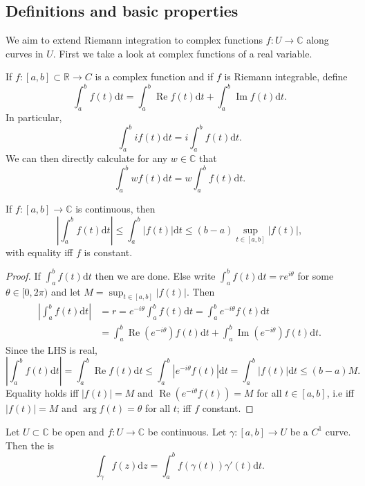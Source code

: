 \documentclass[egregdoesnotlikesansseriftitles,a4paper]{scrartcl}
\begin{document}
\subsection{Definitions and basic properties}
We aim to extend Riemann integration to complex functions $f: U \rightarrow \mathbb{C}$ along curves in $U$. First we take a look at complex functions of a real variable. 
\begin{definition*}
      If $f: [a,b] \subset \mathbb{R} \rightarrow C$ is a complex function and if $f$ is Riemann integrable, define \[
      \int_{a}^{b}f (t) \mathrm{d}t= \int_{a}^{b}\operatorname{Re} f (t) \mathrm{d}t+ \int_{a}^{b}\operatorname{Im}f (t) \mathrm{d}t   
      .\] In particular, \[
      \int_{a}^{b}i f (t) \mathrm{d}t =i \int_{a}^{b}f (t) \mathrm{d}t  
      .\] We can then directly calculate for any $w \in \mathbb{C}$ that \[
          \int_{a}^{b}w f (t) \mathrm{d}t =w\int_{a}^{b}f (t) \mathrm{d}t 
      .\] 
\end{definition*}
\begin{proposition}
      If $f: [a,b] \rightarrow \mathbb{C}$ is continuous, then \[
      |\int_{a}^{b} f (t) \mathrm{d}t | \leq \int_{a}^{b} |f (t)| \mathrm{d}t \leq (b-a) \sup_{t \in [a,b]} |f (t)|
      ,\] with equality iff $f$ is constant. 
\end{proposition}
\begin{proof}
      If $\int_{a}^{b}f (t) \mathrm{d}t $ then we are done. Else write $\int_{a}^{b}f (t) \mathrm{d}t= re^{i \theta} $ for some $\theta \in [0,2\pi)$ and let $M=\sup_{t \in [a,b]} |f (t)|$. Then 
      \begin{align*}
           |\int_{a}^{b}f (t) \mathrm{d}t| &=r= e^{-i \theta}\int_{a}^{b}f (t) \mathrm{d}t=\int_{a}^{b}e^{-i \theta}f (t) \mathrm{d}t\\
           &=\int_{a}^{b}\operatorname{Re}(e^{-i \theta}) f (t) \mathrm{d}t+ \int_{a}^{b} \operatorname{Im}(e^{-i \theta})f (t) \mathrm{d}t. 
      \end{align*}
      Since the LHS is real, \[
      |\int_{a}^{b}f (t) \mathrm{d}t|=\int_{a}^{b}\operatorname{Re} f (t) \mathrm{d}t \leq  \int_{a}^{b}|e^{-i \theta} f (t)| \mathrm{d}t=\int_{a}^{b}| f (t)| \mathrm{d}t\leq (b-a)M
      .\] 
      Equality holds iff $|f (t)|=M$ and $\operatorname{Re} (e ^{-i \theta}f (t))=M$ for all $t \in [a,b]$, i.e iff $|f (t)|=M$ and $\operatorname{arg} f (t)= \theta$ for all $t$; iff $f$ constant.
\end{proof}
\begin{definition*}
      Let $U \subset \mathbb{C}$ be open and $f: U \rightarrow \mathbb{C}$ be continuous. Let $\gamma: [a,b] \rightarrow U$ be a $C^1$ curve. Then the  is \[
      \int_{\gamma}^{}f (z) \mathrm{d}z= \int_{a}^{b} f (\gamma (t))\gamma' (t) \mathrm{d}t  
      .\]
\end{definition*}
\end{document}
